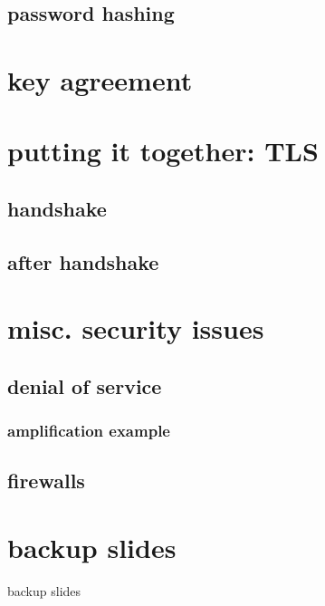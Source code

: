 

\subsection{password hashing}



\section{key agreement}



\section{putting it together: TLS}

\subsection{handshake}


\subsection{after handshake}


\section{misc. security issues}

\subsection{denial of service}


\subsubsection{amplification example}

\subsection{firewalls} %



\section{backup slides}
\begin{frame}{backup slides}
\end{frame}
